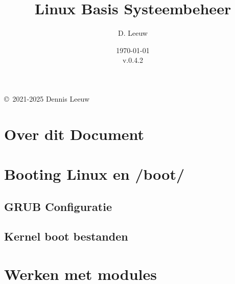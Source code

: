 \documentclass[a4paper,12pt,twoside,openright,titlepage]{book}
\author{D. Leeuw}
\title{Linux Basis Systeembeheer}
\date{\today\\v.0.4.2}
\begin{document}

\maketitle

\copyright\ 2021-2025 Dennis Leeuw\\




\frontmatter
\chapter{Over dit Document}
%
%

\tableofcontents

\mainmatter
%

%

\chapter{Booting Linux en /boot/}

\section{GRUB Configuratie}

\section{Kernel boot bestanden}


\chapter{Werken met modules}


\end{document}
